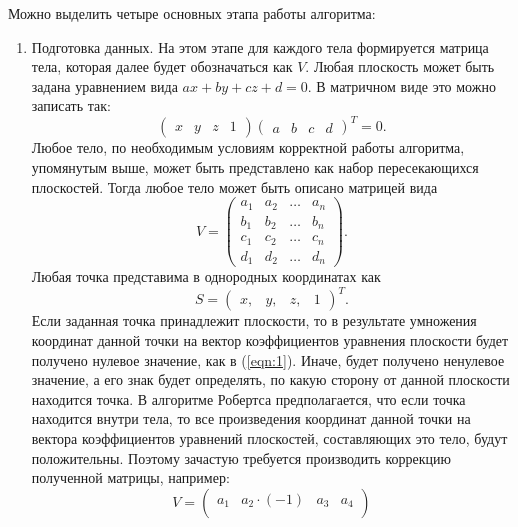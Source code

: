 Можно выделить четыре основных этапа работы алгоритма:
\begin{enumerate}[label={\arabic*)}]
	\item Подготовка данных. На этом этапе для каждого тела формируется матрица тела, которая далее будет обозначаться как $V$. Любая плоскость может быть задана уравнением вида $ax + by + cz + d = 0$. В матричном виде это можно записать так: \begin{equation} \label{eqn:1} \begin{pmatrix}
			x & y & z & 1
		\end{pmatrix}\begin{pmatrix}
			a & b & c & d
		\end{pmatrix}^{T} = 0. \end{equation}
		Любое тело, по необходимым условиям корректной работы алгоритма, упомянутым выше, может быть представлено как набор пересекающихся плоскостей. Тогда любое тело может быть описано матрицей вида \begin{equation}
		V = \begin{pmatrix}
			a_{1} & a_{2} & \ldots & a_{n}\\
			b_{1} & b_{2} & \ldots & b_{n}\\
			c_{1} & c_{2} & \ldots & c_{n}\\
			d_{1} & d_{2} & \ldots & d_{n}
		\end{pmatrix}.
	\end{equation}
	Любая точка представима в однородных координатах как \begin{equation}
		S = \begin{pmatrix} x, & y, & z, & 1 \end{pmatrix}^{T}.
	\end{equation}
	Если заданная точка принадлежит плоскости, то в результате умножения координат данной точки на вектор коэффициентов уравнения плоскости будет получено нулевое значение, как в (\ref{eqn:1}).
	Иначе, будет получено ненулевое значение, а его знак будет определять, по какую сторону от данной плоскости находится точка. В алгоритме Робертса предполагается, что если точка находится внутри тела, то все произведения координат данной точки на вектора коэффициентов уравнений плоскостей, составляющих это тело, будут положительны. Поэтому зачастую требуется производить коррекцию полученной матрицы, например:
	\begin{equation} \label{eqn:2}
		V = \begin{pmatrix}
			a_{1} & a_{2} \cdot (-1) & a_{3} & a_{4}\\

\end{pmatrix}
\end{equation}
\end{enumerate}
